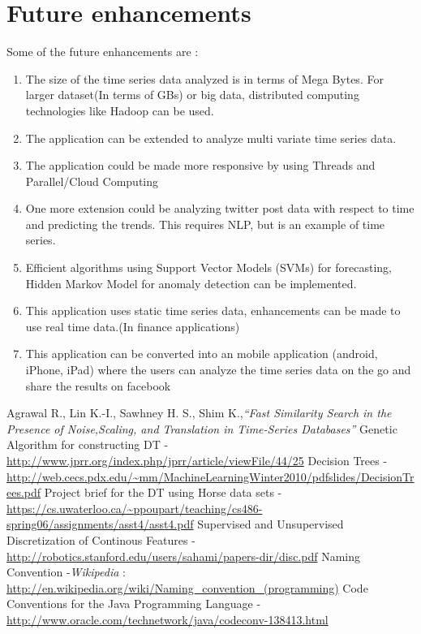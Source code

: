\documentclass[12pt]{report}
\begin{document}
\section{Future enhancements}
Some of the future enhancements are :
\begin{enumerate}
\item{The size of the  time series data analyzed is in terms of Mega Bytes. For larger dataset(In terms of GBs) or big data, distributed computing technologies like Hadoop can be used.}
\item{}The application can be extended to analyze multi variate time series data.
\item{The application could be made more responsive by using Threads and Parallel/Cloud Computing}
\item{One more extension could be analyzing twitter post data with respect to time and predicting the trends. This requires NLP, but is an example of time series.}
\item{Efficient algorithms using Support Vector Models (SVMs) for forecasting, Hidden Markov Model for anomaly detection can be implemented.}
\item{This application uses static time series data, enhancements can be made to use real time data.(In finance applications)}

\item{This application can be converted into an mobile application (android, iPhone, iPad) where the users can analyze the time series data on the go and share the results on facebook}

\end{enumerate}



\begin{thebibliography}{refs}
Agrawal R., Lin K.-I., Sawhney H. S., Shim K.,\textit{“Fast Similarity Search in the Presence of Noise,Scaling, and Translation in Time-Series Databases”}
Genetic Algorithm for constructing DT - \url{http://www.jprr.org/index.php/jprr/article/viewFile/44/25}
Decision Trees - \url{http://web.cecs.pdx.edu/~mm/MachineLearningWinter2010/pdfslides/DecisionTrees.pdf}
 Project brief for the DT  using Horse data sets  - \url{https://cs.uwaterloo.ca/~ppoupart/teaching/cs486-spring06/assignments/asst4/asst4.pdf}
Supervised and Unsupervised Discretization of Continous Features - \url{http://robotics.stanford.edu/users/sahami/papers-dir/disc.pdf}
Naming Convention -\textit{Wikipedia} :  \url{http://en.wikipedia.org/wiki/Naming_convention_(programming)}
Code Conventions for the Java Programming Language - \url{http://www.oracle.com/technetwork/java/codeconv-138413.html}


\end{thebibliography}
\end{document}
